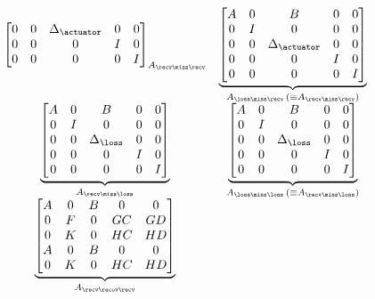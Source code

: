 \begin{equation}
{\begin{matrix}
{\begin{bmatrix}
            0 & 0 & \Delta_\actuator & 0 & 0 \\
            0 & 0 & 0 & I & 0 \\
            0 & 0 & 0 & 0 & I \\
        \end{bmatrix}}_{A_{\recv\miss\recv}} &
        \underbrace{\begin{bmatrix}
            A & 0 & B & 0 & 0 \\
            0 & I & 0 & 0 & 0 \\
            0 & 0 & \Delta_\actuator & 0 & 0 \\
            0 & 0 & 0 & I & 0 \\
            0 & 0 & 0 & 0 & I \\
        \end{bmatrix}}_{A_{\loss\miss\recv}\, (\equiv A_{\recv\miss\recv})} \\[4em]
        \underbrace{\begin{bmatrix}
            A & 0 & B & 0 & 0 \\
            0 & I & 0 & 0 & 0 \\
            0 & 0 & \Delta_\loss & 0 & 0 \\
            0 & 0 & 0 & I & 0 \\
            0 & 0 & 0 & 0 & I \\
        \end{bmatrix}}_{A_{\recv\miss\loss}} &
        \underbrace{\begin{bmatrix}
            A & 0 & B & 0 & 0 \\
            0 & I & 0 & 0 & 0 \\
            0 & 0 & \Delta_\loss & 0 & 0 \\
            0 & 0 & 0 & I & 0 \\
            0 & 0 & 0 & 0 & I \\
        \end{bmatrix}}_{A_{\loss\miss\loss}\, (\equiv A_{\recv\miss\loss})} \\[4em]
        \underbrace{\begin{bmatrix}
            A & 0 & B & 0 & 0 \\
            0 & F & 0 & GC & GD \\
            0 & K & 0 & HC & HD \\
            A & 0 & B & 0 & 0 \\
            0 & K & 0 & HC & HD \\
        \end{bmatrix}}_{A_{\recv\recov\recv}} &

\end{matrix}}
\end{equation}
